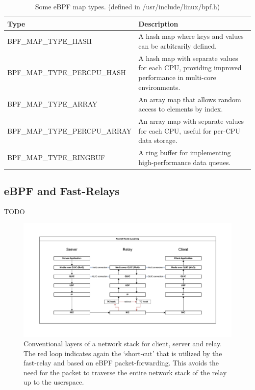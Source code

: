 \begin{table}[htbp]
    \centering
    \begin{tabular}{L{7cm}L{7cm}}
        \toprule
            Type & Description \\
        \midrule
            BPF\_MAP\_TYPE\_HASH & A hash map where keys and values can be arbitrarily defined. \\
        \midrule
            BPF\_MAP\_TYPE\_PERCPU\_HASH & A hash map with separate values for each CPU, providing improved performance in multi-core environments. \\
        \midrule
            BPF\_MAP\_TYPE\_ARRAY & An array map that allows random access to elements by index. \\
        \midrule
            BPF\_MAP\_TYPE\_PERCPU\_ARRAY & An array map with separate values for each CPU, useful for per-CPU data storage. \\
        \midrule
            BPF\_MAP\_TYPE\_RINGBUF & A ring buffer for implementing high-performance data queues. \\
        \bottomrule
    \end{tabular}
    \caption[TODO: add this to tables and figures for better naming]{Some eBPF map types. (defined in /usr/include/linux/bpf.h)}\label{tab:eBPF-map-types}
\end{table}

\subsection{eBPF and Fast-Relays}
TODO

\FloatBarrier

\begin{figure}[htbp] %
    \centering
    \includegraphics[width=\textwidth]{figures/02_background/route-layering.drawio.pdf}
    \caption{Conventional layers of a network stack for client, server and relay.
    The red loop indicates again the `short-cut' that is utilized by the fast-relay and 
    based on eBPF packet-forwarding.
    This avoids the need for the packet to traverse the entire network stack of the relay 
    up to the userspace.}\label{fig:route-layering}
\end{figure}
